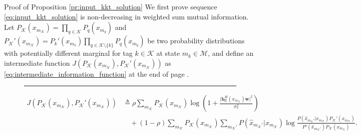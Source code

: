 \documentclass[journal]{IEEEtran}
\begin{document}
\begin{appendix}
	\begin{subsection}{Proof of Proposition \ref{pr:input_kkt_solution}}
		We first prove sequence \eqref{eq:input_kkt_solution} is non-decreasing in weighted sum mutual information.
		Let $P_{\mathcal{K}}(x_{m_{\mathcal{K}}}) = \prod_{q \in \mathcal{K}} P_q(x_{m_q})$ and $P_{\mathcal{K}}'(x_{m_{\mathcal{K}}}) = P_k'(x_{m_k}) \prod_{q \in \mathcal{K} \setminus \{k\}} P_q(x_{m_q})$ be two probability distributions with potentially different marginal for tag $k \in \mathcal{K}$ at state $m_k \in \mathcal{M}$, and define an intermediate function $J \left( P_{\mathcal{K}}(x_{m_{\mathcal{K}}}),P_{\mathcal{K}}'(x_{m_{\mathcal{K}}}) \right)$ as \eqref{eq:intermediate_information_function} at the end of page \pageref{eq:intermediate_information_function}.
		\begin{figure}[!b]
			\hrule
			\begin{align}
				J \left( P_{\mathcal{K}}(x_{m_{\mathcal{K}}}),P_{\mathcal{K}}'(x_{m_{\mathcal{K}}}) \right)
				 & \triangleq \rho \sum_{m_{\mathcal{K}}} P_{\mathcal{K}}(x_{m_{\mathcal{K}}}) \log \left(1 + \frac{\lvert \boldsymbol{h}_{\mathrm{E}}^H(x_{m_{\mathcal{K}}}) \boldsymbol{w} \rvert^2}{\sigma_v^2}\right)\nonumber                                                                                                                    \\
				 & \quad + (1 - \rho) \sum_{m_{\mathcal{K}}} P_{\mathcal{K}}(x_{m_{\mathcal{K}}}) \sum_{m_{\mathcal{K}}'} P(\hat{x}_{m_{\mathcal{K}}'}|x_{m_{\mathcal{K}}}) \log \frac{P(\hat{x}_{m_{\mathcal{K}}'}|x_{m_{\mathcal{K}}}) P_{\mathcal{K}}'(x_{m_{\mathcal{K}}})}{P'(\hat{x}_{m_{\mathcal{K}}'}) P_{\mathcal{K}}(x_{m_{\mathcal{K}}})}.
				\label{eq:intermediate_information_function}
			\end{align}

\end{figure}
\end{subsection}
\end{appendix}
\end{document}
